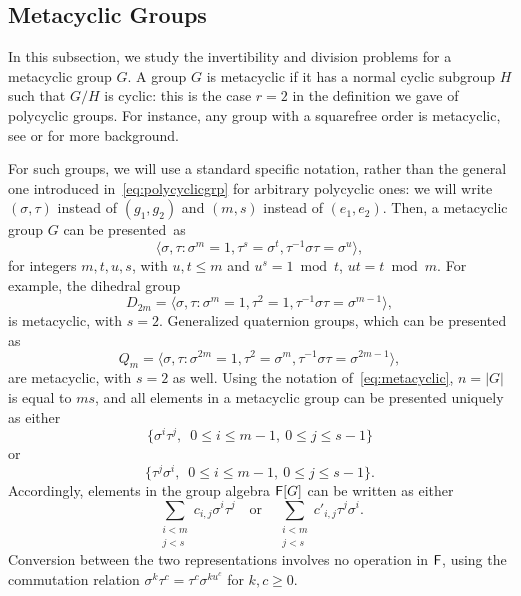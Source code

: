 
\subsection{Metacyclic Groups}

In this subsection, we study the invertibility and division problems
for a metacyclic group $G$. A group $G$ is metacyclic if it has a
normal cyclic subgroup $H$ such that $G/H$ is cyclic: this is the case
$r=2$ in the definition we gave of polycyclic groups. For instance,
any group with a squarefree order is metacyclic, see
\citep[p.~88]{Johnson} or \citep[p.~334]{Curtis} for more
background. 

For such groups, we will use a standard specific notation, rather than
the general one introduced in~\eqref{eq:polycyclicgrp} for arbitrary
polycyclic ones: we will write $(\sigma,\tau)$ instead of $(g_1,g_2)$
and $(m,s)$ instead of $(e_1,e_2)$. Then, a metacyclic group $G$ can
be presented~as
\begin{equation}
  \label{eq:metacyclic}
  \langle \sigma,\tau: \sigma^m = 1,  \tau^s = \sigma^t, \tau^{-1}\sigma \tau = \sigma^u \rangle,
\end{equation}
for integers $m,t,u,s$, with $u,t \leq m$ and $u^s = 1 \bmod t$, $ut =
t \bmod m$. For example, the dihedral group
$$D_{2m} = \langle \sigma,\tau: \sigma^m =1, \tau^2 = 1, \tau^{-1}
\sigma \tau = \sigma^{m-1} \rangle, $$ is metacyclic, with
$s=2$. Generalized quaternion groups, which can be presented as
$$Q_m = \langle \sigma,\tau: \sigma^{2m} =1, \tau^2 = \sigma^m,
\tau^{-1} \sigma \tau = \sigma^{2m-1} \rangle,$$ are metacyclic, with
$s=2$ as well. Using the notation of~\eqref{eq:metacyclic}, $n=|G|$ is
equal to $ms$, and all elements in a metacyclic group can be presented
uniquely as either
\begin{equation}\label{pres1}
\{\sigma^i \tau^j,\,\,\, 0\leq i \leq m-1,\ 0\leq j \leq s-1\}  
\end{equation}
or
\begin{equation}\label{pres2}
\{ \tau^j\sigma^i,\,\,\, 0\leq i \leq m-1,\ 0\leq j \leq s-1\}.
\end{equation}
Accordingly, elements in the group algebra ${\mathsf{F}}[G]$ can be written as 
either 
$$\sum_{\substack{i <m\\ j< s}} c_{i,j} \sigma^i \tau^j
\quad\text{or}\quad \sum_{\substack{i <m\\ j< s}} c'_{i,j} \tau^j
\sigma^i.$$ Conversion between the two representations involves no
operation in ${\mathsf{F}}$, using the commutation relation $\sigma^k \tau^c =
\tau^c \sigma^{ku^c}$ for $k,c \ge 0$.

